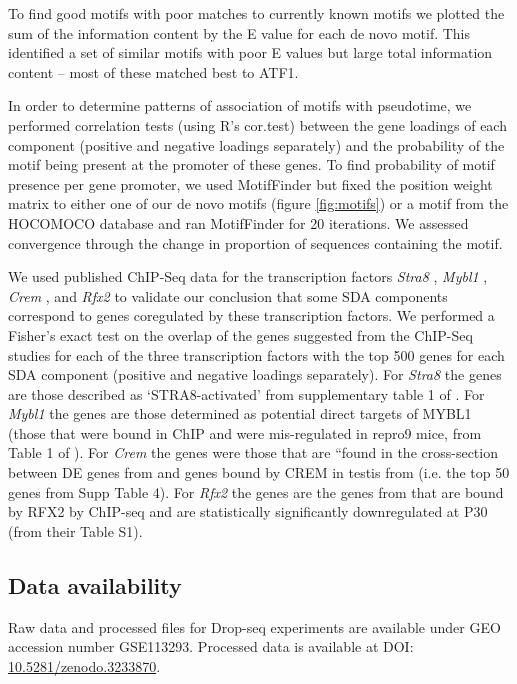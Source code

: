 To find good motifs with poor matches to currently known motifs we plotted the sum of the information content by the E value for each de novo motif.
This identified a set of similar motifs with poor E values but large total information content – most of these matched best to ATF1.

In order to determine patterns of association of motifs with pseudotime, we performed correlation tests (using R’s cor.test) between the gene loadings of each component (positive and negative loadings separately) and the probability of the motif being present at the promoter of these genes.
To find probability of motif presence per gene promoter, we used MotifFinder but fixed the position weight matrix to either one of our de novo motifs (figure \ref{fig:motifs}) or a motif from the HOCOMOCO database and ran MotifFinder for 20 iterations.
We assessed convergence through the change in proportion of sequences containing the motif.

We used published ChIP-Seq data for the transcription factors \textit{Stra8} \parencite{Kojima2019Amplification}, \textit{Mybl1} \parencite{Bolcun-Filas2011AMYB}, \textit{Crem} \parencite{Kosir2012Novel}, and \textit{Rfx2} \parencite{Kistler2015RFX2} to validate our conclusion that some SDA components correspond to genes coregulated by these transcription factors.
We performed a Fisher’s exact test on the overlap of the genes suggested from the ChIP-Seq studies for each of the three transcription factors with the top 500 genes for each SDA component (positive and negative loadings separately).
For \textit{Stra8} the genes are those described as ‘STRA8-activated’ from supplementary table 1 of \cite{Kojima2019Amplification}.
For \textit{Mybl1} the genes are those determined as potential direct targets of MYBL1 (those that were bound in ChIP and were mis-regulated in repro9 mice, from Table 1 of \cite{Bolcun-Filas2011AMYB}).
For \textit{Crem} the genes were those that are “found in the cross-section between DE genes from \cite{Kosir2012Novel} and genes bound by CREM in testis from \cite{Martianov2005Polar} (i.e. the top 50 genes from \cite{Kosir2012Novel} Supp Table 4).
For \textit{Rfx2} the genes are the genes from \cite{Kistler2015RFX2} that are bound by RFX2 by ChIP-seq and are statistically significantly downregulated at P30 (from their Table S1).

\subsection{Data availability}

Raw data and processed files for Drop-seq experiments are available under GEO accession number GSE113293.
Processed data is available at DOI: \href{http://www.doi.org/10.5281/zenodo.3233870}{10.5281/zenodo.3233870}.
